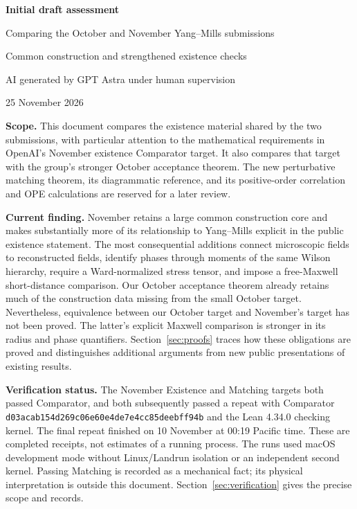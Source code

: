 \documentclass[11pt]{article}
\newcommand{\code}[1]{{\small\nolinkurl{#1}}}
\begin{document}
\begin{center}
{\large\bfseries Initial draft assessment}\par
{\large Comparing the October and November Yang--Mills submissions}\par
{\small Common construction and strengthened existence checks}\par
{\small AI generated by GPT Astra under human supervision}\par
{\small 25 November 2026}
\end{center}

\textbf{Scope.} This document compares the existence material shared by the two
submissions, with particular attention to the mathematical requirements in
OpenAI's November existence Comparator target. It also compares that target
with the group's stronger October acceptance theorem. The new perturbative
matching theorem, its diagrammatic reference, and its positive-order
correlation and OPE calculations are reserved for a later review.

\textbf{Current finding.} November retains a large common construction core
and makes substantially more of its relationship to Yang--Mills explicit in
the public existence statement. The most consequential additions connect
microscopic fields to reconstructed fields, identify phases through moments
of the same Wilson hierarchy, require a Ward-normalized stress tensor, and
impose a free-Maxwell short-distance comparison. Our October acceptance
theorem already retains much of the construction data missing from the small
October target. Nevertheless, equivalence between our October target and
November's target has not been proved. The latter's explicit Maxwell
comparison is stronger in its radius and phase quantifiers. Section~\ref{sec:proofs}
traces how these obligations are proved and distinguishes additional
arguments from new public presentations of existing results.

\textbf{Verification status.} The November Existence and Matching targets
both passed Comparator, and both subsequently passed a repeat with Comparator
\code{d03acab154d269c06e60e4de7e4cc85deebff94b} and the Lean 4.34.0 checking
kernel. The final repeat finished on 10 November at 00:19 Pacific time.
These are completed receipts, not estimates of a running process. The runs
used macOS development mode without Linux/Landrun isolation or an independent
second kernel. Passing Matching is recorded as a mechanical fact; its physical
interpretation is outside this document. Section~\ref{sec:verification}
gives the precise scope and records.
\end{document}
